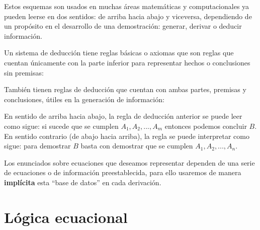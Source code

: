 \documentclass[11pt,letterpaper]{article}
\begin{document}
Estos esquemas son usados en muchas \'areas matem\'aticas y computacionales ya 
pueden leerse en dos sentidos: de arriba hacia abajo y viceversa, dependiendo 
de 
un prop\'osito en el desarrollo de una demostraci\'on: generar, derivar o 
deducir informaci\'on.

Un sistema de deducci\'on tiene reglas b\'asicas o axiomas que son reglas que 
cuentan \'unicamente con la parte inferior para representar hechos o 
conclusiones sin premisas:
\begin{mathpar}
\end{mathpar}
Tambi\'en tienen reglas de deducci\'on que cuentan con ambas partes, premisas y 
conclusiones, \'utiles en la generaci\'on de informaci\'on:
\begin{mathpar}
\end{mathpar}


En sentido de arriba hacia abajo, la regla de deducción anterior se puede leer 
como sigue: si sucede que se cumplen $A_{1}, A_{2}, ..., A_{m}$ entonces podemos 
concluir $B$. En sentido contrario (de abajo hacia arriba), la regla se puede 
interpretar como sigue: para demostrar $B$ basta con demostrar que se cumplen 
$A_{1}, A_{2}, ... , A_{n}$.




Los enunciados sobre ecuaciones que deseamos representar dependen de una serie 
de ecuaciones o de informaci\'on preestablecida, para ello usaremos de manera 
\textbf{impl\'icita} esta \enquote{base de datos} en cada derivaci\'on. 

\section{L\'ogica ecuacional}
\end{document}
